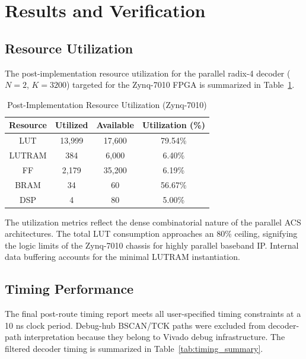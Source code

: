\documentclass[conference]{IEEEtran}
\begin{document}
\section{Results and Verification}

\subsection{Resource Utilization}
The post-implementation resource utilization for the parallel radix-4 decoder ($N=2$, $K=3200$) targeted for the Zynq-7010 FPGA is summarized in Table~\ref{tab:utilization}.

\begin{table}[htbp]
\caption{Post-Implementation Resource Utilization (Zynq-7010)}
\begin{center}
\begin{tabular}{|c|c|c|c|}
\hline
\textbf{Resource} & \textbf{Utilized} & \textbf{Available} & \textbf{Utilization (\%)} \\
\hline
LUT & 13,999 & 17,600 & 79.54\% \\
\hline
LUTRAM & 384 & 6,000 & 6.40\% \\
\hline
FF & 2,179 & 35,200 & 6.19\% \\
\hline
BRAM & 34 & 60 & 56.67\% \\
\hline
DSP & 4 & 80 & 5.00\% \\
\hline
\end{tabular}
\label{tab:utilization}
\end{center}
\end{table}

The utilization metrics reflect the dense combinatorial nature of the parallel ACS architectures. The total LUT consumption approaches an 80\% ceiling, signifying the logic limits of the Zynq-7010 chassis for highly parallel baseband IP. Internal data buffering accounts for the minimal LUTRAM instantiation.

\subsection{Timing Performance}
The final post-route timing report meets all user-specified timing constraints at a 10 ns clock period. Debug-hub BSCAN/TCK paths were excluded from decoder-path interpretation because they belong to Vivado debug infrastructure. The filtered decoder timing is summarized in Table~\ref{tab:timing_summary}.
\end{document}
